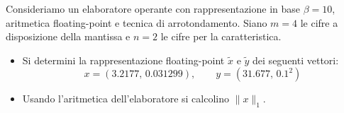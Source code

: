 Consideriamo un elaboratore operante con rappresentazione in base
$\beta=10$, aritmetica floating-point e tecnica di
arrotondamento. Siano $m=4$ le cifre a disposizione
della mantissa e $n=2$ le cifre per la caratteristica.\\
\begin{itemize}
\item
\noindent Si determini la rappresentazione floating-point
$\widetilde{x}$ e $\widetilde{y}$ dei seguenti vettori:
\[ x=(3.2177,\,  0.031299), \quad \quad  y=(31.677, \, 0.1^{2}) \]

\item
\noindent Usando l'aritmetica dell'elaboratore si calcolino $\|x\|_1$.
\end{itemize}
